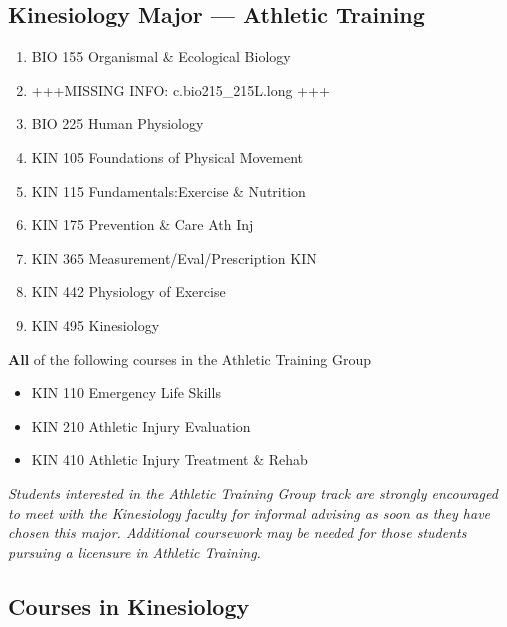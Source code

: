 \documentclass[
  letterpaper,
]{scrbook}
\providecommand{\tightlist}{%
  \setlength{\itemsep}{0pt}\setlength{\parskip}{0pt}}
\begin{document}
\subsection{Kinesiology Major --- Athletic
Training}\label{kinesiology-major-athletic-training}

\begin{enumerate}
\def\labelenumi{\arabic{enumi}.}
\tightlist
\item
  BIO 155 Organismal \& Ecological Biology
\item
  +++MISSING INFO: c.bio215\_215L.long +++
\item
  BIO 225 Human Physiology
\item
  KIN 105 Foundations of Physical Movement
\item
  KIN 115 Fundamentals:Exercise \& Nutrition
\item
  KIN 175 Prevention \& Care Ath Inj
\item
  KIN 365 Measurement/Eval/Prescription KIN
\item
  KIN 442 Physiology of Exercise
\item
  KIN 495 Kinesiology
\end{enumerate}

\textbf{All} of the following courses in the Athletic Training Group

\begin{itemize}
\tightlist
\item
  KIN 110 Emergency Life Skills
\item
  KIN 210 Athletic Injury Evaluation
\item
  KIN 410 Athletic Injury Treatment \& Rehab
\end{itemize}

\emph{Students interested in the Athletic Training Group track are
strongly encouraged to meet with the Kinesiology faculty for informal
advising as soon as they have chosen this major. Additional coursework
may be needed for those students pursuing a licensure in Athletic
Training. }

\subsection{Courses in Kinesiology}\label{courses-in-kinesiology}
\end{document}
